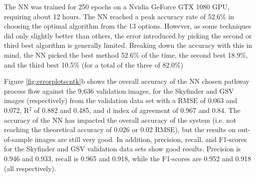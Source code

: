 \documentclass[final,3p,times,authoryear]{elsarticle}
\begin{document}
The NN was trained for 250 epochs on a Nvidia GeForce GTX 1080 GPU, requiring about 12 hours. The NN reached a peak accuracy rate of 52.6\% in choosing the optimal algorithm from the 13 options. However, as some techniques did only slightly better than others, the error introduced by picking the second or third best algorithm is generally limited. Breaking down the accuracy with this in mind, the NN picked the best method 52.6\% of the time, the second best 18.9\%, and the third best 10.5\% (for a total of the three of 82.0\%)

Figure \ref{fig:errorplotscntk}b shows the overall accuracy of the NN chosen pathway process flow against the 9,636 validation images, for the Skyfinder and GSV images (respectively) from the validation data set with a RMSE of 0.063 and 0.072, R$^{2}$ of 0.882 and 0.485, and d index of agreement of 0.967 and 0.84. The accuracy of the NN has impacted the overall accuracy of the system (i.e. not reaching the theoretical accuracy of 0.026 or 0.02 RMSE), but the results on out-of-sample images are still very good. In addition, precision, recall, and F1-scores for the Skyfinder and GSV validation data sets show good results. Precision is 0.946 and 0.933, recall is 0.965 and 0.918, while the F1-scores are 0.952 and 0.918 (all respectively).












\end{document}
